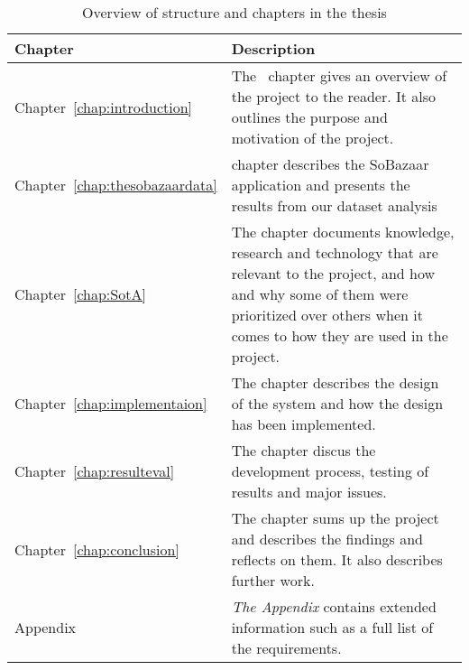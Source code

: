 \begin{table}[H]
  \centering
  \begin{tabular}{lp{11cm}}
  \toprule
    \textbf{Chapter}      & \textbf{Description} \\
  \midrule

    Chapter~\ref{chap:introduction} & The~\nameref{chap:introduction} chapter gives an overview of the
    project to the reader. It also outlines the purpose and motivation of the
    project.  \\[1.5ex]

    Chapter~\ref{chap:thesobazaardata} & \nameref{chap:thesobazaardata} chapter
    describes the SoBazaar application and presents the results from our
    dataset analysis \\[1.5ex]

    Chapter~\ref{chap:SotA} & The \nameref{chap:SotA} chapter documents knowledge,
    research and technology that are relevant to the project, and how and why
    some of them were prioritized over others when it comes to how they are
    used in the project. \\[1.5ex]

    Chapter~\ref{chap:implementaion} & The \nameref{chap:implementaion} chapter describes the design of the
    system and how the design has been implemented. \\[1.5ex]

    Chapter~\ref{chap:resulteval} & The \nameref{chap:resulteval} chapter discus the development process,
    testing of results and major issues. \\[1.5ex]

    Chapter~\ref{chap:conclusion} & The \nameref{chap:conclusion} chapter sums up the project and describes the
    findings and reflects on them. It also describes further work.
    \\[1.5ex]

    Appendix & \textit{The Appendix} contains extended information such as a full list of the requirements. \\

  \bottomrule
  \end{tabular}
  \caption{Overview of structure and chapters in the thesis}
  \label{table-reportstructure}
\end{table}
